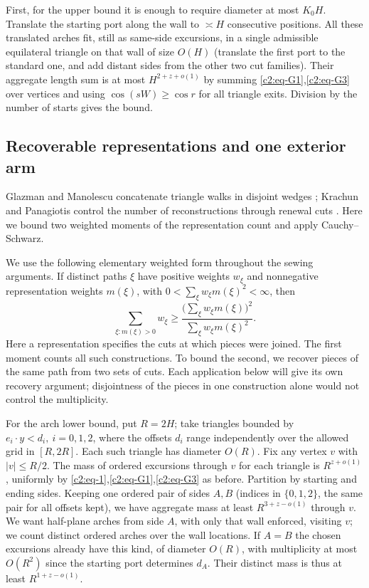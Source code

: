 First, for the upper bound it is enough to require diameter at most \(K_0H\). Translate the starting port along the wall to \(\asymp H\) consecutive positions. All these translated arches fit, still as same-side excursions, in a single admissible equilateral triangle on that wall of size \(O(H)\) (translate the first port to the standard one, and add distant sides from the other two cut families). Their aggregate length sum is at most \(H^{2+z+o(1)}\) by summing \eqref{c2:eq-G1},\eqref{c2:eq-G3} over vertices and using \(\cos(sW)\ge\cos r\) for all triangle exits. Division by the number of starts gives the bound.

\subsection{Recoverable representations and one exterior arm}
Glazman and Manolescu concatenate triangle walks in disjoint wedges
\cite[Section~4.1]{GlazmanManolescu2017}; Krachun and Panagiotis control
the number of reconstructions through renewal cuts
\cite[Section~3]{KrachunPanagiotis2026}. Here we bound two weighted moments
of the representation count and apply Cauchy--Schwarz.

We use the following elementary weighted form throughout the sewing
arguments. If distinct paths \(\xi\) have positive weights
\(w_\xi\) and nonnegative representation weights \(m(\xi)\), with
\(0<\sum_\xi w_\xi m(\xi)^2<\infty\), then
\begin{equation}
 \sum_{\xi:m(\xi)>0}w_\xi
 \ge \frac{\big(\sum_\xi w_\xi m(\xi)\big)^2}
 {\sum_\xi w_\xi m(\xi)^2}.
 \label{eq:sewing-cauchy}
\end{equation}
Here a representation specifies the cuts at which pieces were joined.
The first moment counts all such constructions. To bound the second, we
recover pieces of the same path from two sets of cuts. Each application
below will give its own recovery argument; disjointness of the pieces in
one construction alone would not control the multiplicity.

For the arch lower bound, put \(R=2H\); take triangles bounded by \(e_i\cdot y<d_i,\ i=0,1,2\), where the offsets \(d_i\) range independently over the allowed grid in \([R,2R]\). Each such triangle has diameter \(O(R)\). Fix any vertex \(v\) with \(|v|\le R/2\). The mass of ordered excursions through \(v\) for each triangle is \(R^{z+o(1)}\), uniformly by \eqref{c2:eq-1},\eqref{c2:eq-G1},\eqref{c2:eq-G3} as before. Partition by starting and ending sides. Keeping one ordered pair of sides \(A,B\) (indices in \(\{0,1,2\}\), the same pair for all offsets kept), we have aggregate mass at least \(R^{3+z-o(1)}\) through \(v\). We want half-plane arches from side \(A\), with only that wall enforced, visiting \(v\); we count distinct ordered arches over the wall locations. If \(A=B\) the chosen excursions already have this kind, of diameter \(O(R)\), with multiplicity at most \(O(R^2)\) since the starting port determines \(d_A\). Their distinct mass is thus at least \(R^{1+z-o(1)}\).

